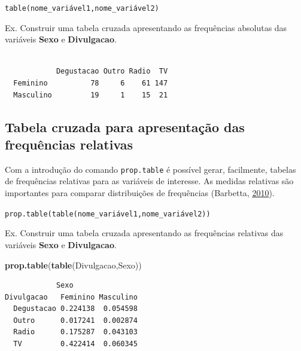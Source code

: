 \documentclass[12pt,brazil,oneside]{book}
\newenvironment{Shaded}{\begin{snugshade}}{\end{snugshade}}
\newcommand{\KeywordTok}[1]{\textcolor[rgb]{0.13,0.29,0.53}{\textbf{#1}}}
\newcommand{\NormalTok}[1]{#1}
\newcommand{\OperatorTok}[1]{\textcolor[rgb]{0.81,0.36,0.00}{\textbf{#1}}}
\begin{document}
\texttt{table(nome\_variável1,nome\_variável2)}

Ex. Construir uma tabela cruzada apresentando as frequências absolutas das variáveis \textbf{Sexo} e \textbf{Divulgacao}.

\begin{Shaded}
\end{Shaded}

\begin{verbatim}
           
            Degustacao Outro Radio  TV
  Feminino          78     6    61 147
  Masculino         19     1    15  21
\end{verbatim}

\hypertarget{tabela-cruzada-para-apresentacao-das-frequencias-relativas}{%
\subsection{Tabela cruzada para apresentação das frequências relativas}\label{tabela-cruzada-para-apresentacao-das-frequencias-relativas}}

Com a introdução do comando \texttt{prop.table} é possível gerar, facilmente, tabelas de frequências relativas para as variáveis de interesse. As medidas relativas são importantes para comparar distribuições de frequências (Barbetta, \protect\hyperlink{ref-barbetta1988}{2010}).

\texttt{prop.table(table(nome\_variável1,nome\_variável2))}

Ex. Construir uma tabela cruzada apresentando as frequências relativas das variáveis \textbf{Sexo} e \textbf{Divulgacao}.

\begin{Shaded}
\begin{Highlighting}[]
\KeywordTok{prop.table}\NormalTok{(}\KeywordTok{table}\NormalTok{(Divulgacao,Sexo))}
\end{Highlighting}
\end{Shaded}

\begin{verbatim}
            Sexo
Divulgacao   Feminino Masculino
  Degustacao 0.224138  0.054598
  Outro      0.017241  0.002874
  Radio      0.175287  0.043103
  TV         0.422414  0.060345
\end{verbatim}
\end{document}
